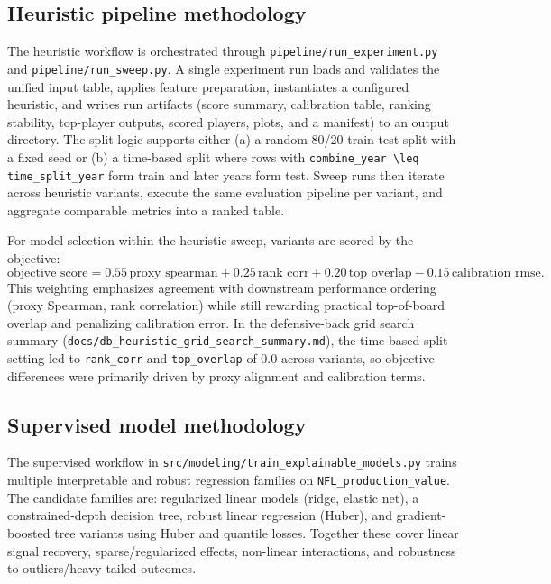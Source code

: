 \subsection{Heuristic pipeline methodology}

The heuristic workflow is orchestrated through \texttt{pipeline/run\_experiment.py} and \texttt{pipeline/run\_sweep.py}. A single experiment run loads and validates the unified input table, applies feature preparation, instantiates a configured heuristic, and writes run artifacts (score summary, calibration table, ranking stability, top-player outputs, scored players, plots, and a manifest) to an output directory. The split logic supports either (a) a random 80/20 train-test split with a fixed seed or (b) a time-based split where rows with \texttt{combine\_year \textbackslash{}leq time\_split\_year} form train and later years form test. Sweep runs then iterate across heuristic variants, execute the same evaluation pipeline per variant, and aggregate comparable metrics into a ranked table.

For model selection within the heuristic sweep, variants are scored by the objective:
\[
\text{objective\_score} = 0.55\,\text{proxy\_spearman} + 0.25\,\text{rank\_corr} + 0.20\,\text{top\_overlap} - 0.15\,\text{calibration\_rmse}.
\]
This weighting emphasizes agreement with downstream performance ordering (proxy Spearman, rank correlation) while still rewarding practical top-of-board overlap and penalizing calibration error. In the defensive-back grid search summary (\texttt{docs/db\_heuristic\_grid\_search\_summary.md}), the time-based split setting led to \texttt{rank\_corr} and \texttt{top\_overlap} of 0.0 across variants, so objective differences were primarily driven by proxy alignment and calibration terms.

\subsection{Supervised model methodology}

The supervised workflow in \texttt{src/modeling/train\_explainable\_models.py} trains multiple interpretable and robust regression families on \texttt{NFL\_production\_value}. The candidate families are: regularized linear models (ridge, elastic net), a constrained-depth decision tree, robust linear regression (Huber), and gradient-boosted tree variants using Huber and quantile losses. Together these cover linear signal recovery, sparse/regularized effects, non-linear interactions, and robustness to outliers/heavy-tailed outcomes.


